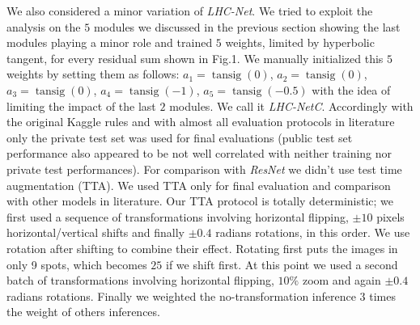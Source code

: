 \documentclass[fleqn,10pt]{SelfArx}
\begin{document}
We also considered a minor variation of \textit{LHC-Net}. We tried to exploit the analysis on the $5$ modules we discussed in the previous section showing the last modules playing a minor role and trained $5$ weights, limited by hyperbolic tangent, for every residual sum shown in Fig.1. We manually initialized this $5$ weights by setting them as follows: $a_1 = \operatorname{tansig}(0)$, $a_2 = \operatorname{tansig}(0)$, $a_3 = \operatorname{tansig}(0)$, $a_4 = \operatorname{tansig}(-1)$, $a_5 = \operatorname{tansig}(-0.5)$ with the idea of limiting the impact of the last $2$ modules. We call it \textit{LHC-NetC}.
Accordingly with the original Kaggle rules and with almost all evaluation protocols in literature only the private test set was used for final evaluations (public test set performance also appeared to be not well correlated with neither training nor private test performances).
For comparison with \textit{ResNet} we didn't use test time augmentation (TTA). We used TTA only for final evaluation and comparison with other models in literature.
Our TTA protocol is totally deterministic; we first used a sequence of transformations involving horizontal flipping, $\pm 10$ pixels horizontal/vertical shifts and finally $\pm 0.4$ radians rotations, in this order. We use rotation after shifting to combine their effect. Rotating first puts the images in only 9 spots, which becomes $25$ if we shift first. At this point we used a second batch of transformations involving horizontal flipping, $10\%$ zoom and again $\pm 0.4$ radians rotations. Finally we weighted the no-transformation inference $3$ times the weight of others inferences.
\end{document}
